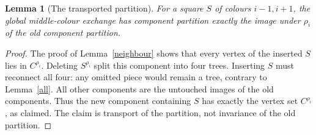 \documentclass[11pt,a4paper]{article}
\newtheorem{lemma}{Lemma}
\begin{document}
\begin{lemma}[The transported partition]\label{partition}
For a square $S$ of colours $i-1,i+1$, the global middle-colour
exchange has component partition exactly the image under $\rho_i$
of the old component partition.
\end{lemma}
\begin{proof}
The proof of Lemma~\ref{neighbour} shows that every vertex of the
inserted $S$ lies in $C^{\rho_i}$. Deleting $S^{\rho_i}$ split this
component into four trees. Inserting $S$ must reconnect all four:
any omitted piece would remain a tree, contrary to Lemma~\ref{all}.
All other components are the untouched images of the old components.
Thus the new component containing $S$ has exactly the vertex set
$C^{\rho_i}$, as claimed. The claim is transport of the partition,
not invariance of the old partition.
\end{proof}
\end{document}
